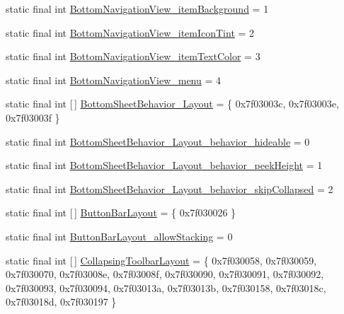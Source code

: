\begin{DoxyCompactItemize}
\item 
static final int \mbox{\hyperlink{classandroid_1_1support_1_1design_1_1_r_1_1styleable_a03151091a8b9f1439495dccf695424de}{Bottom\+Navigation\+View\+\_\+item\+Background}} = 1
\item 
static final int \mbox{\hyperlink{classandroid_1_1support_1_1design_1_1_r_1_1styleable_a26afc659fa7b05094ab53ad2633c39ad}{Bottom\+Navigation\+View\+\_\+item\+Icon\+Tint}} = 2
\item 
static final int \mbox{\hyperlink{classandroid_1_1support_1_1design_1_1_r_1_1styleable_a7633cb42f2cb714be7efeb16c2f75c9b}{Bottom\+Navigation\+View\+\_\+item\+Text\+Color}} = 3
\item 
static final int \mbox{\hyperlink{classandroid_1_1support_1_1design_1_1_r_1_1styleable_a416c3947a2a572a1fc9977dd8b0da73a}{Bottom\+Navigation\+View\+\_\+menu}} = 4
\item 
static final int \mbox{[}$\,$\mbox{]} \mbox{\hyperlink{classandroid_1_1support_1_1design_1_1_r_1_1styleable_a7f0e23bcec0de42839219ed2cfbcb1fe}{Bottom\+Sheet\+Behavior\+\_\+\+Layout}} = \{ 0x7f03003c, 0x7f03003e, 0x7f03003f \}
\item 
static final int \mbox{\hyperlink{classandroid_1_1support_1_1design_1_1_r_1_1styleable_ab59518af90b1ab471b72c231617e5365}{Bottom\+Sheet\+Behavior\+\_\+\+Layout\+\_\+behavior\+\_\+hideable}} = 0
\item 
static final int \mbox{\hyperlink{classandroid_1_1support_1_1design_1_1_r_1_1styleable_adb170df08b76e54f33ccc436cfca032d}{Bottom\+Sheet\+Behavior\+\_\+\+Layout\+\_\+behavior\+\_\+peek\+Height}} = 1
\item 
static final int \mbox{\hyperlink{classandroid_1_1support_1_1design_1_1_r_1_1styleable_af755616a860deb9a129d5bb25d4219d6}{Bottom\+Sheet\+Behavior\+\_\+\+Layout\+\_\+behavior\+\_\+skip\+Collapsed}} = 2
\item 
static final int \mbox{[}$\,$\mbox{]} \mbox{\hyperlink{classandroid_1_1support_1_1design_1_1_r_1_1styleable_a4f0d1f5f070f55c0bbcd76e065dda963}{Button\+Bar\+Layout}} = \{ 0x7f030026 \}
\item 
static final int \mbox{\hyperlink{classandroid_1_1support_1_1design_1_1_r_1_1styleable_a27a9a94f99002736c9c1a6f034b26da6}{Button\+Bar\+Layout\+\_\+allow\+Stacking}} = 0
\item 
static final int \mbox{[}$\,$\mbox{]} \mbox{\hyperlink{classandroid_1_1support_1_1design_1_1_r_1_1styleable_a4a019838b1c3daad84b4ffff397db335}{Collapsing\+Toolbar\+Layout}} = \{ 0x7f030058, 0x7f030059, 0x7f030070, 0x7f03008e, 0x7f03008f, 0x7f030090, 0x7f030091, 0x7f030092, 0x7f030093, 0x7f030094, 0x7f03013a, 0x7f03013b, 0x7f030158, 0x7f03018c, 0x7f03018d, 0x7f030197 \}

\end{DoxyCompactItemize}
